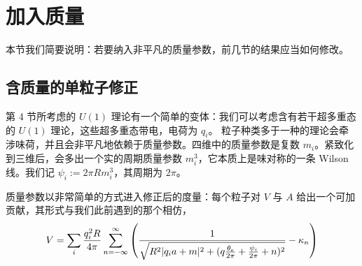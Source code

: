 \section{加入质量}
\label{sec:masses}

本节我们简要说明：若要纳入非平凡的质量参数，前几节的结果应当如何修改。

\subsection{含质量的单粒子修正}

第 4 节所考虑的 $U(1)$ 理论有一个简单的变体：我们可以考虑含有若干超多重态的 $U(1)$ 理论，这些超多重态带电，电荷为 $q_i$。%
粒子种类多于一种的理论会牵涉味荷，并且会非平凡地依赖于质量参数。四维中的质量参数是复数 $m_i$。紧致化到三维后，会多出一个实的周期质量参数 $m^3_i$，它本质上是味对称的一条 Wilson 线。我们记 $\psi_i := 2\pi R m^3_i$，其周期为 $2\pi$。

质量参数以非常简单的方式进入修正后的度量：每个粒子对 $V$ 与 $A$ 给出一个可加贡献，其形式与我们此前遇到的那个相仿，
\begin{equation} \label{eq:V-sum-masses}
V = \sum_i \frac{q_i^2 R}{4 \pi} \sum_{n=-\infty}^\infty \left(
\frac{1}{\sqrt{R^2 \lvert q_i a + m \rvert^2 + (q \frac{\theta_{\mathrm{e}}}{2 \pi} +
\frac{\psi_i}{2 \pi} + n)^2}} - \kappa_n \right)
\end{equation}

